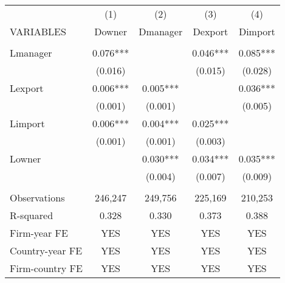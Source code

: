 \begin{tabular}{lcccc} \hline
 & (1) & (2) & (3) & (4) \\
VARIABLES & Downer & Dmanager & Dexport & Dimport \\ \hline
 &  &  &  &  \\
Lmanager & 0.076*** &  & 0.046*** & 0.085*** \\
 & (0.016) &  & (0.015) & (0.028) \\
Lexport & 0.006*** & 0.005*** &  & 0.036*** \\
 & (0.001) & (0.001) &  & (0.005) \\
Limport & 0.006*** & 0.004*** & 0.025*** &  \\
 & (0.001) & (0.001) & (0.003) &  \\
Lowner &  & 0.030*** & 0.034*** & 0.035*** \\
 &  & (0.004) & (0.007) & (0.009) \\
 &  &  &  &  \\
Observations & 246,247 & 249,756 & 225,169 & 210,253 \\
R-squared & 0.328 & 0.330 & 0.373 & 0.388 \\
Firm-year FE & YES & YES & YES & YES \\
Country-year FE & YES & YES & YES & YES \\
 Firm-country FE & YES & YES & YES & YES \\ \hline
\end{tabular}
